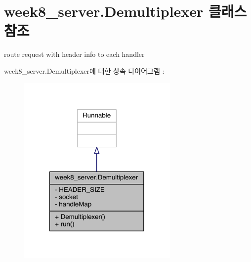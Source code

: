 \hypertarget{classweek8__server_1_1_demultiplexer}{\section{week8\-\_\-server.\-Demultiplexer 클래스 참조}
\label{classweek8__server_1_1_demultiplexer}
}


route request with header info to each handler  




week8\-\_\-server.\-Demultiplexer에 대한 상속 다이어그램 \-: 
\nopagebreak
\begin{figure}[H]
\begin{center}
\leavevmode
\includegraphics[width=222pt]{classweek8__server_1_1_demultiplexer__inherit__graph}
\end{center}
\end{figure}


